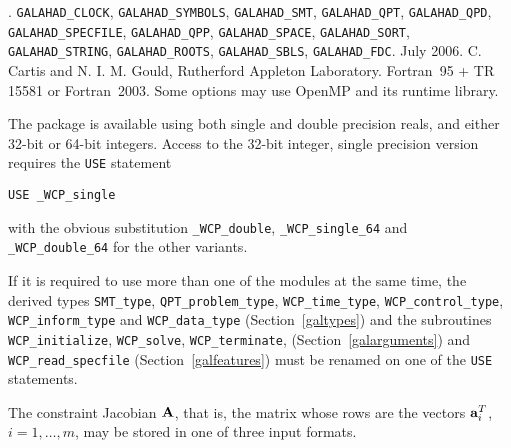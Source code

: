 \documentclass{galahad}
\newcommand{\packagename}{WCP}
\newcommand{\fullpackagename}{\libraryname\_\-\packagename}
\begin{document}

\galattributes
\galversions{\tt  \fullpackagename\_single, \fullpackagename\_double}.
\galuses 
{\tt GALAHAD\_\-CLOCK},
{\tt GALAHAD\_SY\-M\-BOLS}, 
{\tt GALAHAD\_SMT},
{\tt GALAHAD\_QPT}, {\tt GALAHAD\_QPD}, {\tt GALAHAD\_SPECFILE}, 
{\tt GALAHAD\_QPP}, {\tt GALAHAD\_SPACE}, {\tt GALAHAD\_\-SORT}, 
{\tt GALAHAD\_STRING}, {\tt GALAHAD\_\-ROOTS}, {\tt GALAHAD\_\-SBLS},
{\tt GALAHAD\_FDC}.
\galdate July 2006.
\galorigin C. Cartis and N. I. M. Gould, Rutherford Appleton Laboratory.
\gallanguage Fortran~95 + TR 15581 or Fortran~2003. 
\galparallelism Some options may use OpenMP and its runtime library.


\galhowto


The package is available using both single and double precision reals, 
and either 32-bit or 64-bit integers. Access to the 32-bit integer,
single precision version requires the {\tt USE} statement
\medskip

\hspace{8mm} {\tt USE \fullpackagename\_single}

\medskip
\noindent
with the obvious substitution {\tt \fullpackagename\_double},
{\tt \fullpackagename\_single\_64} and 
{\tt \fullpackagename\_double\_64} for the other variants.

\noindent
If it is required to use more than one of the modules at the same time, 
the derived types
{\tt SMT\_type}, 
{\tt QPT\_problem\_type}, 
{\tt \packagename\_time\_type}, 
{\tt \packagename\_control\_type}, 
{\tt \packagename\_inform\_type} 
and
{\tt \packagename\_data\_type}
(Section~\ref{galtypes})
and the subroutines
{\tt \packagename\_initialize}, 
{\tt \packagename\_\-solve},
{\tt \packagename\_terminate},
(Section~\ref{galarguments})
and 
{\tt \packagename\_read\_specfile}
(Section~\ref{galfeatures})
must be renamed on one of the {\tt USE} statements.


\galmatrix
The constraint Jacobian ${\mathbf{A}}$, that is, the matrix 
whose rows are the vectors ${\mathbf{a}}_{i}^{T}$, $i = 1, \ldots , m$, 
may be stored in one of three input formats.
\end{document}
